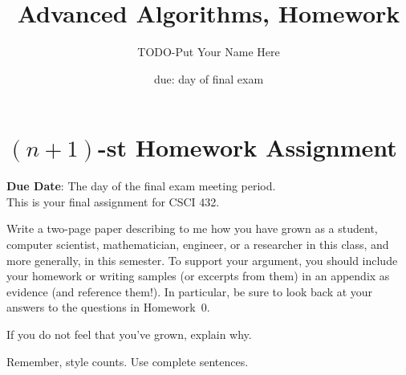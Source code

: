 \documentclass{article}
\title{Advanced Algorithms, Homework \hwnum}
\author{TODO-Put Your Name Here}
\date{due: day of final exam}
\begin{document}
\section*{$(n+1)$-st Homework Assignment}

{\bf{Due Date}}: The day of the final exam meeting period.\\

This is your final assignment for CSCI 432.

Write a two-page paper describing to me how you have grown as a student,
computer scientist, mathematician, engineer, or a researcher in this class, and
more generally, in this semester.  To support your argument, you should include
your homework or writing samples (or excerpts from them) in an appendix as
evidence (and reference them!). In particular, be sure to look back at your
answers to the questions in Homework~$0$.

If you do not feel that you've grown, explain why.

Remember, style counts. Use complete sentences.
\end{document}
